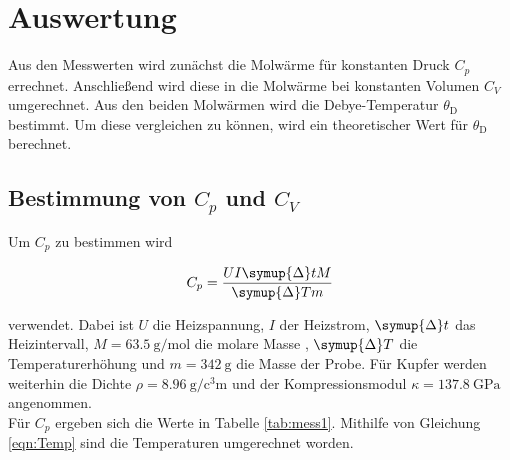 \section{Auswertung}
\label{sec:Auswertung}

Aus den Messwerten wird zunächst die Molwärme für konstanten Druck $C_p$ errechnet. Anschließend wird diese in die Molwärme bei 
konstanten Volumen $C_V$ umgerechnet. Aus den beiden Molwärmen wird die Debye-Temperatur $\theta_\text{D}$ bestimmt. Um diese 
vergleichen zu können, wird ein theoretischer Wert für $\theta_\text{D}$ berechnet. 

\subsection{Bestimmung von $C_p$ und $C_V$}

Um $C_p$ zu bestimmen wird 

\begin{equation*}
    C_p = \frac{U I \symup{\Delta}t M}{\symup{\Delta} T m}
\end{equation*}

verwendet. Dabei ist $U$ die Heizspannung, $I$ der Heizstrom, $\symup{\Delta}t$ das Heizintervall, $M = \SI{63.5}{\gram\per\mole}$ die molare Masse \cite{Molare}, 
$\symup{\Delta}T$ die Temperaturerhöhung und $m = \SI{342}{\gram}$ \cite{Anleitung} die Masse der Probe. Für Kupfer werden weiterhin die Dichte $\rho = \SI{8.96}{\gram\per\cubic\centi\meter}$
\cite{KompDichte} und der Kompressionsmodul $\kappa = \SI{137.8}{\giga\pascal}$ \cite{Molare} angenommen.\\

Für $C_p$ ergeben sich die Werte in Tabelle \ref{tab:mess1}. Mithilfe von Gleichung \eqref{eqn:Temp} sind die Temperaturen umgerechnet worden. 

